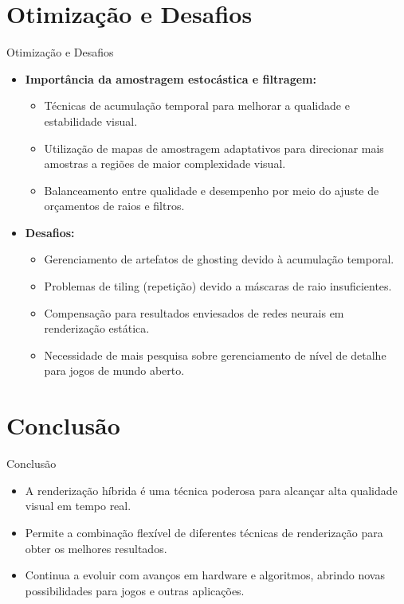 \documentclass[aspectratio=169,xcolor=table]{beamer}
\begin{document}
\section{Otimização e Desafios}
\begin{frame}{Otimização e Desafios}
    \begin{itemize}
        \item \textbf{Importância da amostragem estocástica e filtragem:}
        \begin{itemize}
            \item Técnicas de acumulação temporal para melhorar a qualidade e estabilidade visual.
            \item Utilização de mapas de amostragem adaptativos para direcionar mais amostras a regiões de maior complexidade visual.
            \item Balanceamento entre qualidade e desempenho por meio do ajuste de orçamentos de raios e filtros.
        \end{itemize}
        \item \textbf{Desafios:}
        \begin{itemize}
            \item Gerenciamento de artefatos de ghosting devido à acumulação temporal.
            \item Problemas de tiling (repetição) devido a máscaras de raio insuficientes.
            \item Compensação para resultados enviesados de redes neurais em renderização estática.
            \item Necessidade de mais pesquisa sobre gerenciamento de nível de detalhe para jogos de mundo aberto.
        \end{itemize}
    \end{itemize}
\end{frame}

\section{Conclusão}
\begin{frame}{Conclusão}
    \begin{itemize}
        \item A renderização híbrida é uma técnica poderosa para alcançar alta qualidade visual em tempo real.
        \item Permite a combinação flexível de diferentes técnicas de renderização para obter os melhores resultados.
        \item Continua a evoluir com avanços em hardware e algoritmos, abrindo novas possibilidades para jogos e outras aplicações.
    \end{itemize}
\end{frame}
\end{document}
